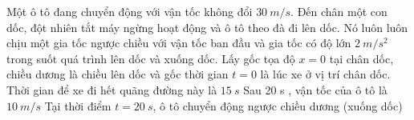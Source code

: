 \begin{ex}%
Một ô tô đang chuyển động với vận tốc không đổi $30\ m / s$. Đến chân một con dốc, đột nhiên tắt máy ngừng hoạt động và ô tô theo đà đi lên dốc. Nó luôn luôn chịu một gia tốc ngược chiều với vận tốc ban đầu và gia tốc có độ lớn $2\ m / s^{2}$ trong suốt quá trình lên dốc và xuống dốc. Lấy gốc tọa độ $x=0$ tại chân dốc, chiều dương là chiều lên dốc và gốc thời gian $t=0$ là lúc xe ở vị trí chân dốc. 
{\True Thời gian để xe đi hết quãng đường này là $15\ s$}
{Sau 20 s , vận tốc của ô tô là $10 \ m/s$}
{\True Tại thời điểm $t=20~s$, ô tô chuyển động ngược chiều dương (xuống dốc)}


\end{ex}


